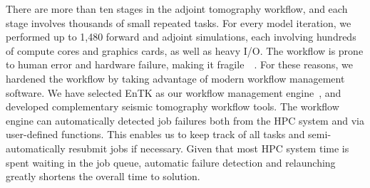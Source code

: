 \documentclass[extra,mreferee]{gji}
\begin{document}
There are more than ten stages in the adjoint tomography workflow,
and each stage involves thousands of small repeated tasks.
For every model iteration,
we performed up to 1,480 forward and adjoint simulations, each involving hundreds of
compute cores and graphics cards, as well as heavy I/O.
The workflow is prone to human error and hardware failure, making it fragile~~\citep{Lefebvre2018}.
For these reasons, we hardened the workflow by taking advantage of modern
workflow management software.
We have selected EnTK as our
workflow management engine~\citep{EnTK2017}, and developed complementary seismic tomography
workflow tools.
The workflow engine can automatically detected job failures both from the
HPC system and via user-defined functions. This enables us to keep track of
all tasks and semi-automatically resubmit jobs if necessary.
Given that most HPC system time is spent waiting in the job queue, automatic
failure detection and relaunching greatly shortens the overall time to solution.





\end{document}
